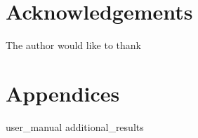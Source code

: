 \documentclass[12pt, oneside]{book}
\begin{document}
\chapter{Acknowledgements}

\begin{notes}
  \item The author would like to thank
\end{notes}

\sstableofcontents

\sslistoffigures

\sslistoftables

\sslistofequations

\begin{listofabbreviations}
\end{listofabbreviations}


%
%
\mainmatter








\begin{references}
	
\end{references}

%

\chapter*{Appendices}

\begin{appendices}	
	 {user_manual}
	 {additional_results}
\end{appendices}

\backmatter
\end{document}
